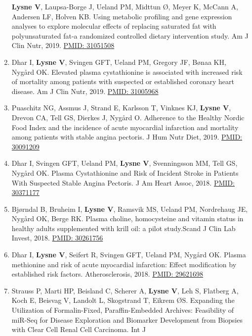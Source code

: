 \documentclass[11pt, a4paper]{awesome-cv}
\begin{document}
\begin{enumerate}
  \textbf{Lysne V}, Laupsa-Borge J, Ueland PM, Midttun Ø, Meyer K,
  McCann A, Andersen LF, Holven KB. Using metabolic profiling and gene
  expression analyses to explore molecular effects of replacing
  saturated fat with polyunsaturated fat-a randomized controlled dietary
  intervention study. Am J Clin Nutr, 2019.
  \href{https://www.ncbi.nlm.nih.gov/pubmed/31051508}{PMID: 31051508}
\item
  Dhar I, \textbf{Lysne V}, Svingen GFT, Ueland PM, Gregory JF, Bønaa
  KH, Nygård OK. Elevated plasma cystathionine is associated with
  increased risk of mortality among patients with suspected or
  established coronary heart disease. Am J Clin Nutr, 2019.
  \href{https://www.ncbi.nlm.nih.gov/pubmed/31005968}{PMID: 31005968}
\item
  Puaschitz NG, Assmus J, Strand E, Karlsson T, Vinknes KJ,
  \textbf{Lysne V}, Drevon CA, Tell GS, Dierkes J, Nygård O. Adherence
  to the Healthy Nordic Food Index and the incidence of acute myocardial
  infarction and mortality among patients with stable angina pectoris. J
  Hum Nutr Diet, 2019.
  \href{https://www.ncbi.nlm.nih.gov/pubmed/30091209}{PMID: 30091209}
\item
  Dhar I, Svingen GFT, Ueland PM, \textbf{Lysne V}, Svenningsson MM,
  Tell GS, Nygård OK. Plasma Cystathionine and Risk of Incident Stroke
  in Patients With Suspected Stable Angina Pectoris. J Am Heart Assoc,
  2018. \href{https://www.ncbi.nlm.nih.gov/pubmed/30371177}{PMID:
  30371177}
\item
  Bjørndal B, Bruheim I, \textbf{Lysne V}, Ramsvik MS, Ueland PM,
  Nordrehaug JE, Nygård OK, Berge RK. Plasma choline, homocysteine and
  vitamin status in healthy adults supplemented with krill oil: a pilot
  study.Scand J Clin Lab Invest, 2018.
  \href{https://www.ncbi.nlm.nih.gov/pubmed/30261756}{PMID: 30261756}
\item
  Dhar I, \textbf{Lysne V}, Seifert R, Svingen GFT, Ueland PM, Nygård
  OK. Plasma methionine and risk of acute myocardial infarction: Effect
  modification by established risk factors. Atherosclerosis, 2018.
  \href{https://www.ncbi.nlm.nih.gov/pubmed/29621698}{PMID: 29621698}
\item
  Strauss P, Marti HP, Beisland C, Scherer A, \textbf{Lysne V}, Leh S,
  Flatberg A, Koch E, Beisvag V, Landolt L, Skogstrand T, Eikrem ØS.
  Expanding the Utilization of Formalin-Fixed, Paraffin-Embedded
  Archives: Feasibility of miR-Seq for Disease Exploration and Biomarker
  Development from Biopsies with Clear Cell Renal Cell Carcinoma. Int J

\end{enumerate}
\end{document}
